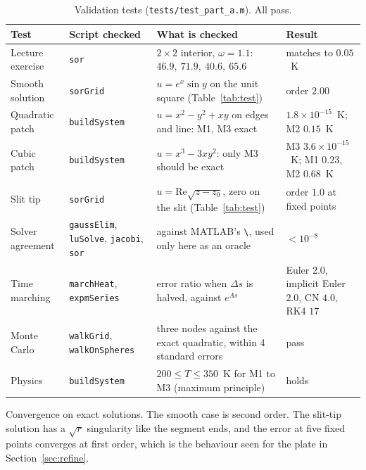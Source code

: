 \begin{table}[H]
\centering\small
\begin{tabular}{@{}P{2.6cm} P{2.6cm} P{5.4cm} P{4.2cm}@{}}
\toprule
Test & Script checked & What is checked & Result \\
\midrule
Lecture exercise & \texttt{sor} & $2\times2$ interior, $\omega=1.1$: $46.9,\ 71.9,\ 40.6,\ 65.6$ & matches to $0.05$~K \\
Smooth solution & \texttt{sorGrid} & $u=e^x\sin y$ on the unit square (Table~\ref{tab:test}) & order $2.00$ \\
Quadratic patch & \texttt{buildSystem} & $u=x^2-y^2+xy$ on edges and line: M1, M3 exact & $1.8\times10^{-15}$~K; M2 $0.15$~K \\
Cubic patch & \texttt{buildSystem} & $u=x^3-3xy^2$: only M3 should be exact & M3 $3.6\times10^{-15}$~K; M1 $0.23$, M2 $0.68$~K \\
Slit tip & \texttt{sorGrid} & $u=\mathrm{Re}\sqrt{z-z_0}$, zero on the slit (Table~\ref{tab:test}) & order $1.0$ at fixed points \\
Solver agreement & \texttt{gaussElim}, \texttt{luSolve}, \texttt{jacobi}, \texttt{sor} & against MATLAB's \texttt{\textbackslash}, used only here as an oracle & $<10^{-8}$ \\
Time marching & \texttt{marchHeat}, \texttt{expmSeries} & error ratio when $\Delta s$ is halved, against $e^{As}$ & Euler $2.0$, implicit Euler $2.0$, CN $4.0$, RK4 $17$ \\
Monte Carlo & \texttt{walkGrid}, \texttt{walkOnSpheres} & three nodes against the exact quadratic, within 4 standard errors & pass \\
Physics & \texttt{buildSystem} & $200\le T\le350$~K for M1 to M3 (maximum principle) & holds \\
\bottomrule
\end{tabular}
\caption{Validation tests (\texttt{tests/test\_part\_a.m}). All pass.}
\label{tab:validation}
\end{table}

\begin{table}[H]
\centering\small

\caption{Convergence on exact solutions. The smooth case is second order. The slit-tip solution has a $\sqrt r$ singularity like
the segment ends, and the error at five fixed points converges at first order, which is the behaviour seen for the plate in
Section~\ref{sec:refine}.}
\label{tab:test}
\end{table}

